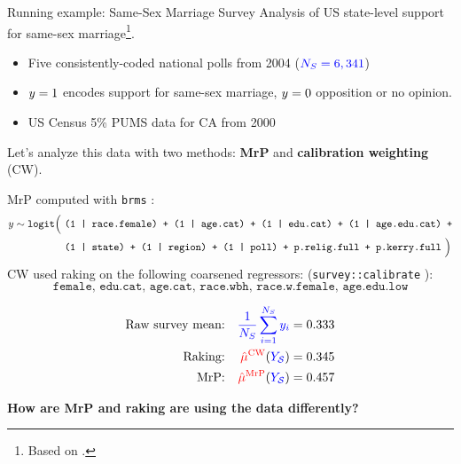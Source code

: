 \begin{frame}[t]{Running example: Same-Sex Marriage Survey}
Analysis of US state-level support for same-sex marriage\footnote{
    Based on \textcite{lax:2009:gay,kastellec:2010:laxmrp}.}.

\begin{itemize}
    \item {} Five consistently-coded national polls from 2004 
        ($\textcolor{blue}{{\textcolor{blue}{N_S}} ={}6,341}$)
    \item {}  $y = 1$ encodes support for same-sex marriage, $y = 0$ opposition
       or no opinion.
    \item {} US Census 5\% PUMS data for CA from 2000
\end{itemize}

Let's analyze this data with two methods: \textbf{MrP} and \textbf{calibration weighting} (CW).

\pause
MrP computed with \texttt{brms} \parencite{brms}:\\
{
\tiny
$$
\begin{aligned}
y \sim{}& \texttt{logit}\Big(~\texttt{(1 | race.female) + (1 | age.cat) + 
  (1 | edu.cat) + (1 | age.edu.cat) +}
  \\{}&\qquad\quad\;\; \texttt{(1 | state) + (1 | region) + (1 | poll) +
  p.relig.full + p.kerry.full}~\Big)
\end{aligned}
$$
}
%
CW used raking on the following coarsened regressors:
({\tiny{\texttt{survey::calibrate}}} \textcite{lumley:2025:survey}):
{
\tiny
$$
\texttt{female, edu.cat, age.cat, race.wbh, race.w.female, age.edu.low}
$$
}
%
\pause
%
\begin{minipage}{0.5\textwidth}
\vspace{-1.5em}
$$
\begin{aligned}
    \textrm{Raw survey mean:} && \textcolor{blue}{\frac{1}{{\textcolor{blue}{N_S}}} \sum_{i=1}^{\textcolor{blue}{N_S}} y_i} ={}& 0.333 \\
    \textrm{Raking:} && \textcolor{red}{\hat{\mu}^{\mathrm{CW}}}(\textcolor{blue}{\textcolor{blue}{Y_{\mathcal{S}}}}) ={}& 0.345 \\
    \textrm{MrP:} && \textcolor{red}{\hat{\mu}^{\mathrm{MrP}}}(\textcolor{blue}{\textcolor{blue}{Y_{\mathcal{S}}}}) ={}& 0.457\\
\end{aligned}
$$
\end{minipage}
\hfill
\begin{minipage}{0.4\textwidth}
\vspace{-1.5em}
    \pause
    \textbf{How are MrP and raking are using the data differently?}
\end{minipage}
%
%
\end{frame}




